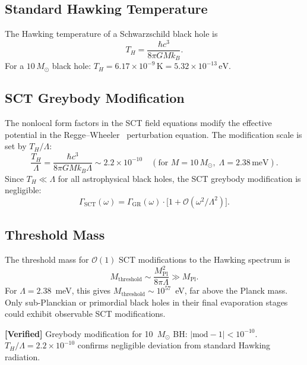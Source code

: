 \documentclass[11pt,a4paper]{article}
\theoremstyle{plain}
\theoremstyle{definition}
\newcommand{\verified}[1]{%
  \par\smallskip\noindent
  \colorbox{green!10}{\parbox{\dimexpr\linewidth-2\fboxsep}{%
    \textcolor{green!50!black}{\textbf{[Verified]}} #1}}%
  \par\smallskip}
\begin{document}
\subsection{Standard Hawking Temperature}

The Hawking temperature of a Schwarzschild black hole is
\begin{equation}\label{eq:T-hawking}
  T_H = \frac{\hbar c^3}{8\pi G M k_B}.
\end{equation}
For a $10\,M_\odot$ black hole:
$T_H = 6.17 \times 10^{-9}\,\mathrm{K}
= 5.32 \times 10^{-13}\,\mathrm{eV}$.

\subsection{SCT Greybody Modification}

The nonlocal form factors in the SCT field equations modify the
effective potential in the Regge--Wheeler~\cite{RW57} perturbation
equation.  The modification scale is set by $T_H/\Lambda$:
\begin{equation}
  \frac{T_H}{\Lambda} = \frac{\hbar c^3}{8\pi G M k_B \Lambda}
  \sim 2.2 \times 10^{-10}
  \quad (\text{for } M = 10\,M_\odot,\; \Lambda = 2.38\,\mathrm{meV}).
\end{equation}
Since $T_H \ll \Lambda$ for all astrophysical black holes, the
SCT greybody modification is negligible:
\begin{equation}\label{eq:greybody-mod}
  \Gamma_{\mathrm{SCT}}(\omega) = \Gamma_{\mathrm{GR}}(\omega)
  \cdot \bigl[1 + \mathcal{O}(\omega^2/\Lambda^2)\bigr].
\end{equation}

\subsection{Threshold Mass}

The threshold mass for $\mathcal{O}(1)$ SCT modifications to the
Hawking spectrum is
\begin{equation}\label{eq:M-threshold}
  M_{\mathrm{threshold}} \sim \frac{M_{\mathrm{Pl}}^2}{8\pi\Lambda}
  \gg M_{\mathrm{Pl}}.
\end{equation}
For $\Lambda = 2.38$~meV, this gives
$M_{\mathrm{threshold}} \sim 10^{57}$~eV, far above the Planck mass.
Only sub-Planckian or primordial black holes in their final
evaporation stages could exhibit observable SCT modifications.

\verified{Greybody modification for 10~$M_\odot$ BH:
$|\mathrm{mod} - 1| < 10^{-10}$.
$T_H/\Lambda = 2.2 \times 10^{-10}$ confirms negligible deviation
from standard Hawking radiation.}
\end{document}
